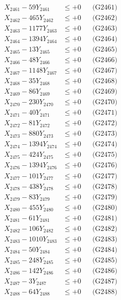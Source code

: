 \documentclass[a4paper,10pt]{article}
\begin{document}
{\begin{align}
\allowbreak
X_{2461} - 59Y_{2461} &\leq +0 && \text{(G2461)} \\
X_{2462} - 465Y_{2462} &\leq +0 && \text{(G2462)} \\
X_{2463} - 1177Y_{2463} &\leq +0 && \text{(G2463)} \\
X_{2464} - 1394Y_{2464} &\leq +0 && \text{(G2464)} \\
X_{2465} - 13Y_{2465} &\leq +0 && \text{(G2465)} \\
X_{2466} - 48Y_{2466} &\leq +0 && \text{(G2466)} \\
X_{2467} - 1148Y_{2467} &\leq +0 && \text{(G2467)} \\
X_{2468} - 35Y_{2468} &\leq +0 && \text{(G2468)} \\
X_{2469} - 86Y_{2469} &\leq +0 && \text{(G2469)} \\
X_{2470} - 230Y_{2470} &\leq +0 && \text{(G2470)} \\
\allowbreak
X_{2471} - 40Y_{2471} &\leq +0 && \text{(G2471)} \\
X_{2472} - 81Y_{2472} &\leq +0 && \text{(G2472)} \\
X_{2473} - 880Y_{2473} &\leq +0 && \text{(G2473)} \\
X_{2474} - 1394Y_{2474} &\leq +0 && \text{(G2474)} \\
X_{2475} - 424Y_{2475} &\leq +0 && \text{(G2475)} \\
X_{2476} - 1394Y_{2476} &\leq +0 && \text{(G2476)} \\
X_{2477} - 101Y_{2477} &\leq +0 && \text{(G2477)} \\
X_{2478} - 438Y_{2478} &\leq +0 && \text{(G2478)} \\
X_{2479} - 83Y_{2479} &\leq +0 && \text{(G2479)} \\
X_{2480} - 455Y_{2480} &\leq +0 && \text{(G2480)} \\
\allowbreak
X_{2481} - 61Y_{2481} &\leq +0 && \text{(G2481)} \\
X_{2482} - 106Y_{2482} &\leq +0 && \text{(G2482)} \\
X_{2483} - 1010Y_{2483} &\leq +0 && \text{(G2483)} \\
X_{2484} - 50Y_{2484} &\leq +0 && \text{(G2484)} \\
X_{2485} - 248Y_{2485} &\leq +0 && \text{(G2485)} \\
X_{2486} - 142Y_{2486} &\leq +0 && \text{(G2486)} \\
X_{2487} - 3Y_{2487} &\leq +0 && \text{(G2487)} \\
X_{2488} - 64Y_{2488} &\leq +0 && \text{(G2488)} \\

\end{align}}
\end{document}

